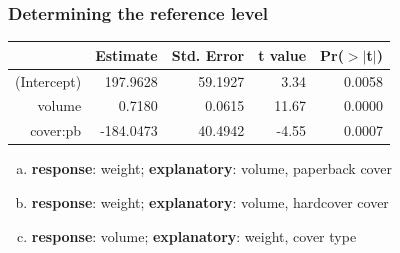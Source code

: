 
\begin{frame}
\frametitle{Determining the reference level}


{\small
\begin{center}
\begin{tabular}{rrrrr}
  \hline
 & Estimate & Std. Error & t value & Pr($>$$|$t$|$) \\ 
  \hline
(Intercept) & 197.9628 & 59.1927 & 3.34 & 0.0058 \\ 
  volume & 0.7180 & 0.0615 & 11.67 & 0.0000 \\ 
  cover:pb & -184.0473 & 40.4942 & -4.55 & 0.0007 \\ 
   \hline
\end{tabular}
\end{center}
}

\begin{enumerate}[(a)]
\item {\bf response}: weight; {\bf explanatory}: volume, paperback cover
\item {\bf response}: weight; {\bf explanatory}: volume, hardcover cover
\item {\bf response}: volume; {\bf explanatory}: weight, cover type
\end{enumerate}

\end{frame}


